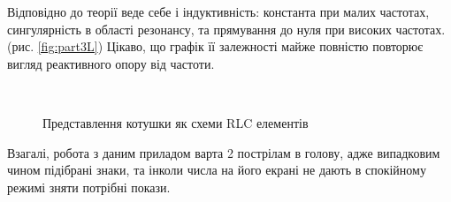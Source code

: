 Відповідно до теорії веде себе і індуктивність: константа при малих частотах, сингулярність в області резонансу, та прямування до нуля при високих частотах. (рис. \ref{fig:part3L}) Цікаво, що графік її залежності майже повністю повторює вигляд реактивного опору від частоти.

\begin{figure}[h]    
         \\
    \caption{Представлення котушки як схеми RLC елементів}
    \label{fig:ssanahuina}
\end{figure}

Взагалі, робота з даним приладом варта 2 пострілам в голову, адже випадковим чином підібрані знаки, та інколи числа на його екрані не дають в спокійному режимі зняти потрібні покази.